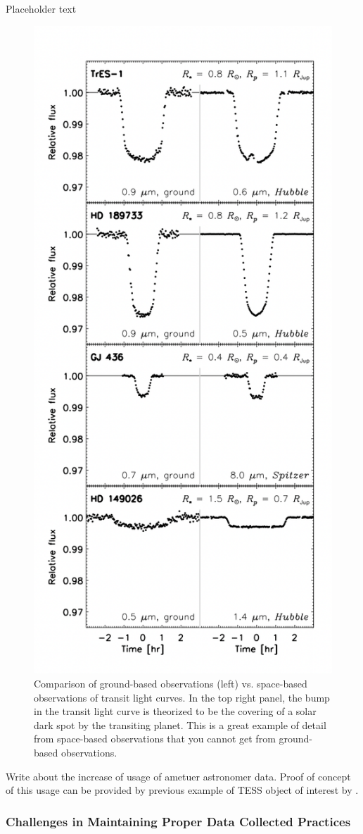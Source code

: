 \documentclass[oneside,12pt]{amsart}
\numberwithin{page}{section}
\begin{document}
Placeholder text

\begin{figure}[htbp]
    \centering
    \includegraphics[width=0.5\linewidth]{figs/winn_fig8.png}
    \caption{Comparison of ground-based observations (left) vs. space-based observations of transit light curves. In the top right panel, the bump in the transit light curve is theorized to be the covering of a solar dark spot by the transiting planet. This is a great example of detail from space-based observations that you cannot get from ground-based observations.}
    \label{fig:winn-fig8}
\end{figure}

Write about the increase of usage of ametuer astronomer data. Proof of concept of this usage can be provided by previous example of TESS object of interest by \citep{sgro2024confirmation}. 
\clearpage

\subsubsection{Challenges in Maintaining Proper Data Collected Practices}

\end{document}
